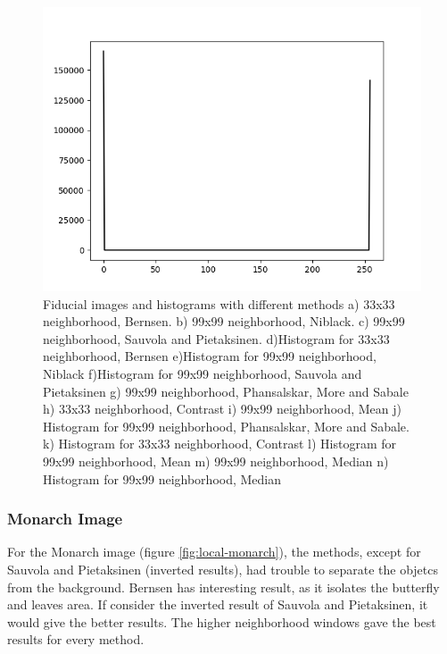 \documentclass[]{IEEEtran}
\begin{document}
\begin{figure}[h]
  \includegraphics[width=0.3\hsize]{images/99x99-window/fiducial_median_histogram.png}

  \caption{Fiducial images and histograms with different methods a) 33x33 neighborhood, Bernsen. b) 99x99 neighborhood, Niblack. c) 99x99 neighborhood, Sauvola and Pietaksinen. d)Histogram for 33x33 neighborhood, Bernsen e)Histogram for 99x99 neighborhood, Niblack f)Histogram for 99x99 neighborhood, Sauvola and Pietaksinen g) 99x99 neighborhood, Phansalskar, More and Sabale h) 33x33 neighborhood, Contrast i) 99x99 neighborhood, Mean j) Histogram for 99x99 neighborhood, Phansalskar, More and Sabale. k) Histogram for 33x33 neighborhood, Contrast l) Histogram for 99x99 neighborhood, Mean m) 99x99 neighborhood, Median n) Histogram for 99x99 neighborhood, Median}
  \label{fig:local-fiducial}
\end{figure}

\subsubsection{Monarch Image}
For the Monarch image (figure \ref{fig:local-monarch}), the methods, except for Sauvola and Pietaksinen (inverted results), had trouble to separate the objetcs from the background. Bernsen has interesting result, as it isolates the butterfly and leaves area. If consider the inverted result of Sauvola and Pietaksinen, it would give the better results. The higher neighborhood windows gave the best results for every method.
\end{document}
